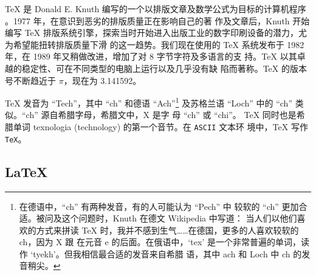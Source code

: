 \TeX{} 是 Donald E.
Knuth 编写的一个以排版文章及数学公式为目标的计算机程序 \cite{texbook}。1977 年，在意识到恶劣的排版质量正在影响自己的著
作及文章后，Knuth 开始编写 \TeX{} 排版系统引擎，探索当时开始进入出版工业的数字印刷设备的潜力，尤为希望能扭转排版质量下滑
的这一趋势。我们现在使用的 \TeX{} 系统发布于 1982 年，在 1989 年又稍做改进，增加了对 8 字节字符及多语言的支
持。\TeX{} 以其卓越的稳定性、可在不同类型的电脑上运行以及几乎没有缺
陷而著称。\TeX{} 的版本号不断趋近于 $\pi$，现在为 3.141592。


\TeX{} 发音为 ``Tech''，其中 ``ch'' 和德语 ``Ach''\footnote{在德语中，``ch'' 有两种发音，有的人可能认为 ``Pech'' 中
较软的 ``ch'' 更加合适。被问及这个问题时，Knuth 在德文 Wikipedia 中写道： \textsf{
当人们以他们喜欢的方式来拼读 \TeX{} 时，我并不感到生气……在德国，更多的人喜欢较软的 ch，因为 X 跟
在元音 e 的后面。在俄语中，`tex' 是一个非常普遍的单词，读作 `tyekh'。但我相信最合适的发音来自希腊
语，其中 ach 和 Loch 中 ch 的发音稍尖。}} 及苏格兰语 ``Loch'' 中的 ``ch'' 类似。``ch'' 源自希腊字母，希腊文中，X 是字
母 ``ch'' 或 ``chi''。 \TeX{} 同时也是希腊单词 texnologia (technology) 的第一个音节。在 \texttt{ASCII} 文本环
境中，\TeX{} 写作 \texttt{TeX}。


\subsection{\LaTeX}

